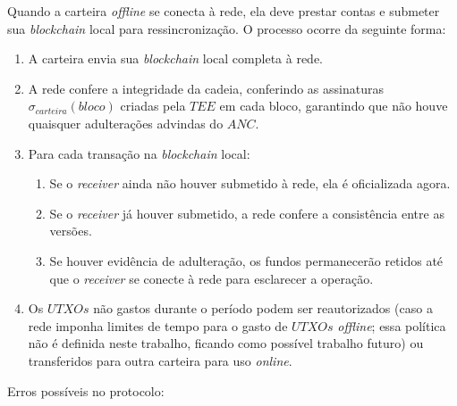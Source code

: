 \documentclass[
  12pt,
  a4paper,
  oneside,
  article,
]{abntex2}
\begin{document}
Quando a carteira \textit{offline} se conecta à rede, ela deve prestar contas e submeter sua \textit{blockchain} local para ressincronização. O processo ocorre da seguinte forma:

\begin{enumerate}
	\item A carteira envia sua \textit{blockchain} local completa à rede.
	\item A rede confere a integridade da cadeia, conferindo as assinaturas $\sigma_{carteira}(bloco)$ criadas pela $TEE$ em cada bloco, garantindo que não houve quaisquer adulterações advindas do $ANC$.
	\item Para cada transação na \textit{blockchain} local:
	      \begin{enumerate}
		      \item Se o \textit{receiver} ainda não houver submetido à rede, ela é oficializada agora.
		      \item Se o \textit{receiver} já houver submetido, a rede confere a consistência entre as versões.
		      \item Se houver evidência de adulteração, os fundos permanecerão retidos até que o \textit{receiver} se conecte à rede para esclarecer a operação.
	      \end{enumerate}
	\item Os $UTXOs$ não gastos durante o período podem ser reautorizados (caso a rede imponha limites de tempo para o gasto de $UTXOs$ \textit{offline}; essa política não é definida neste trabalho, ficando como possível trabalho futuro) ou transferidos para outra carteira para uso \textit{online}.
\end{enumerate}

Erros possíveis no protocolo:
\end{document}
